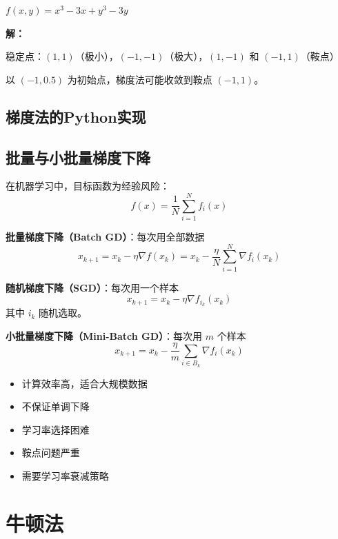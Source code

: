 \begin{example}[非凸函数的梯度法]
$f(x, y) = x^3 - 3x + y^3 - 3y$

\textbf{解：}

稳定点：$(1,1)$（极小），$(-1,-1)$（极大），$(1,-1)$ 和 $(-1,1)$（鞍点）

以 $(-1, 0.5)$ 为初始点，梯度法可能收敛到鞍点 $(-1, 1)$。
\end{example}

\subsection{梯度法的Python实现}\label{sec:gradient-code}

\subsection{批量与小批量梯度下降}\label{sec:sgd}

\begin{conceptbox}
在机器学习中，目标函数为经验风险：
\[
f(x) = \frac{1}{N}\sum_{i=1}^{N} f_i(x)
\]

\textbf{批量梯度下降（Batch GD）}：每次用全部数据
\[
x_{k+1} = x_k - \eta \nabla f(x_k) = x_k - \frac{\eta}{N}\sum_{i=1}^{N} \nabla f_i(x_k)
\]

\textbf{随机梯度下降（SGD）}：每次用一个样本
\[
x_{k+1} = x_k - \eta \nabla f_{i_k}(x_k)
\]
其中 $i_k$ 随机选取。

\textbf{小批量梯度下降（Mini-Batch GD）}：每次用 $m$ 个样本
\[
x_{k+1} = x_k - \frac{\eta}{m}\sum_{i \in B_k} \nabla f_i(x_k)
\]
\end{conceptbox}

\begin{notebox}[SGD的特点]
\begin{itemize}
    \item 计算效率高，适合大规模数据
    \item 不保证单调下降
    \item 学习率选择困难
    \item 鞍点问题严重
    \item 需要学习率衰减策略
\end{itemize}
\end{notebox}

\section{牛顿法}\label{sec:newton}

